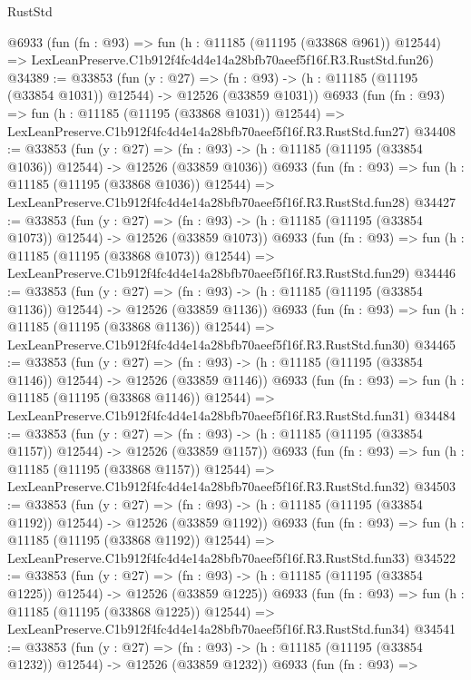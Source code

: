 \begin{lexlean}{RustStd}
\begin{coremodule}
    @6933
    (fun (fn : @93) =>
    fun (h : @11185 (@11195 (@33868 @961)) @12544) =>
    LexLeanPreserve.C1b912f4fc4d4e14a28bfb70aeef5f16f.R3.RustStd.fun26)
@34389 := @33853
    (fun (y : @27) =>
    (fn : @93) -> (h : @11185 (@11195 (@33854 @1031)) @12544) -> @12526 (@33859 @1031))
    @6933
    (fun (fn : @93) =>
    fun (h : @11185 (@11195 (@33868 @1031)) @12544) =>
    LexLeanPreserve.C1b912f4fc4d4e14a28bfb70aeef5f16f.R3.RustStd.fun27)
@34408 := @33853
    (fun (y : @27) =>
    (fn : @93) -> (h : @11185 (@11195 (@33854 @1036)) @12544) -> @12526 (@33859 @1036))
    @6933
    (fun (fn : @93) =>
    fun (h : @11185 (@11195 (@33868 @1036)) @12544) =>
    LexLeanPreserve.C1b912f4fc4d4e14a28bfb70aeef5f16f.R3.RustStd.fun28)
@34427 := @33853
    (fun (y : @27) =>
    (fn : @93) -> (h : @11185 (@11195 (@33854 @1073)) @12544) -> @12526 (@33859 @1073))
    @6933
    (fun (fn : @93) =>
    fun (h : @11185 (@11195 (@33868 @1073)) @12544) =>
    LexLeanPreserve.C1b912f4fc4d4e14a28bfb70aeef5f16f.R3.RustStd.fun29)
@34446 := @33853
    (fun (y : @27) =>
    (fn : @93) -> (h : @11185 (@11195 (@33854 @1136)) @12544) -> @12526 (@33859 @1136))
    @6933
    (fun (fn : @93) =>
    fun (h : @11185 (@11195 (@33868 @1136)) @12544) =>
    LexLeanPreserve.C1b912f4fc4d4e14a28bfb70aeef5f16f.R3.RustStd.fun30)
@34465 := @33853
    (fun (y : @27) =>
    (fn : @93) -> (h : @11185 (@11195 (@33854 @1146)) @12544) -> @12526 (@33859 @1146))
    @6933
    (fun (fn : @93) =>
    fun (h : @11185 (@11195 (@33868 @1146)) @12544) =>
    LexLeanPreserve.C1b912f4fc4d4e14a28bfb70aeef5f16f.R3.RustStd.fun31)
@34484 := @33853
    (fun (y : @27) =>
    (fn : @93) -> (h : @11185 (@11195 (@33854 @1157)) @12544) -> @12526 (@33859 @1157))
    @6933
    (fun (fn : @93) =>
    fun (h : @11185 (@11195 (@33868 @1157)) @12544) =>
    LexLeanPreserve.C1b912f4fc4d4e14a28bfb70aeef5f16f.R3.RustStd.fun32)
@34503 := @33853
    (fun (y : @27) =>
    (fn : @93) -> (h : @11185 (@11195 (@33854 @1192)) @12544) -> @12526 (@33859 @1192))
    @6933
    (fun (fn : @93) =>
    fun (h : @11185 (@11195 (@33868 @1192)) @12544) =>
    LexLeanPreserve.C1b912f4fc4d4e14a28bfb70aeef5f16f.R3.RustStd.fun33)
@34522 := @33853
    (fun (y : @27) =>
    (fn : @93) -> (h : @11185 (@11195 (@33854 @1225)) @12544) -> @12526 (@33859 @1225))
    @6933
    (fun (fn : @93) =>
    fun (h : @11185 (@11195 (@33868 @1225)) @12544) =>
    LexLeanPreserve.C1b912f4fc4d4e14a28bfb70aeef5f16f.R3.RustStd.fun34)
@34541 := @33853
    (fun (y : @27) =>
    (fn : @93) -> (h : @11185 (@11195 (@33854 @1232)) @12544) -> @12526 (@33859 @1232))
    @6933
    (fun (fn : @93) =>

\end{coremodule}
\end{lexlean}
